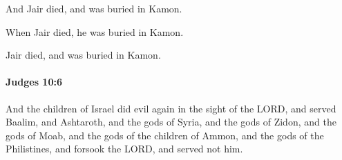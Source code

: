 			\begin{versebox}
					\item[BHS] 
					\item[ASV] And Jair died, and was buried in Kamon.
					\item[NIV] When Jair died, he was buried in Kamon.
					\item[NRSV] Jair died, and was buried in Kamon.
			\end{versebox}

		\paragraph{Judges 10:6} %
			\label{JUDGES-10-6}

			And the children of Israel did evil again in the sight of the LORD, and served Baalim, and Ashtaroth, and the gods of Syria, and the gods of Zidon, and the gods of Moab, and the gods of the children of Ammon, and the gods of the Philistines, and forsook the LORD, and served not him.

